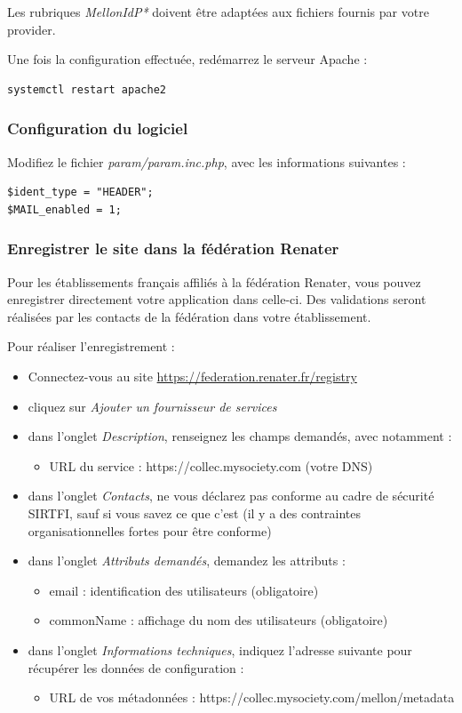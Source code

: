 Les rubriques \textit{MellonIdP*} doivent être adaptées aux fichiers fournis par votre provider.

Une fois la configuration effectuée, redémarrez le serveur Apache :
\begin{lstlisting}
systemctl restart apache2
\end{lstlisting}

\subsubsection{Configuration du logiciel}
Modifiez le fichier \textit{param/param.inc.php}, avec les informations suivantes :

\begin{lstlisting}
$ident_type = "HEADER";
$MAIL_enabled = 1;
\end{lstlisting}

\subsubsection{Enregistrer le site dans la fédération Renater}

Pour les établissements français affiliés à la fédération Renater, vous pouvez enregistrer directement votre application dans celle-ci. Des validations seront réalisées par les contacts de la fédération dans votre établissement.

Pour réaliser l'enregistrement :
\begin{itemize}
	\item Connectez-vous au site \href{https://federation.renater.fr/registry}{https://federation.renater.fr/registry}
	\item cliquez sur \textit{Ajouter un fournisseur de services}
	\item  dans l'onglet \textit{Description}, renseignez les champs demandés, avec notamment :
	\begin{itemize}
		\item URL du service : https://collec.mysociety.com (votre DNS)
	\end{itemize}
	\item  dans l'onglet \textit{Contacts}, ne vous déclarez pas conforme au cadre de sécurité SIRTFI, sauf si vous savez ce que c'est (il y a des contraintes organisationnelles fortes pour être conforme)
	\item dans l'onglet \textit{Attributs demandés}, demandez les attributs :
	\begin{itemize}
		\item email : identification des utilisateurs (obligatoire)
		\item commonName : affichage du nom des utilisateurs (obligatoire)
	\end{itemize}
	\item dans l'onglet \textit{Informations techniques}, indiquez l'adresse suivante pour récupérer les données de configuration :
	\begin{itemize}
		\item URL de vos métadonnées : https://collec.mysociety.com/mellon/metadata
	\end{itemize}
\end{itemize}

